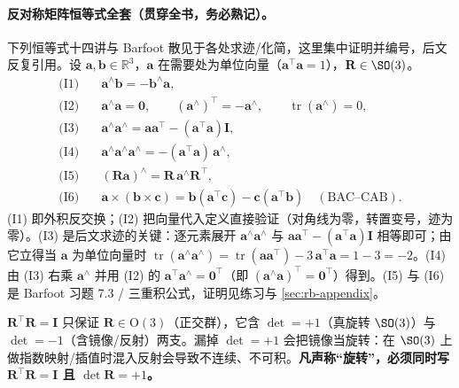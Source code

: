 \paragraph{反对称矩阵恒等式全套（贯穿全书，务必熟记）。}下列恒等式十四讲与 Barfoot 散见于各处求迹/化简，这里集中证明并编号，后文反复引用。设 $\mathbf{a},\mathbf{b}\in\mathbb{R}^3$，$\mathbf{a}$ 在需要处为单位向量（$\mathbf{a}^\top\mathbf{a}=1$），$\mathbf{R}\in\SO(3)$。
\begin{align}
  \text{(I1)}\quad& \mathbf{a}^\wedge\mathbf{b}=-\mathbf{b}^\wedge\mathbf{a}, \label{eq:rb-id1}\\
  \text{(I2)}\quad& \mathbf{a}^\wedge\mathbf{a}=\mathbf{0},\qquad (\mathbf{a}^\wedge)^\top=-\mathbf{a}^\wedge,\qquad \operatorname{tr}(\mathbf{a}^\wedge)=0, \label{eq:rb-id2}\\
  \text{(I3)}\quad& \mathbf{a}^\wedge\mathbf{a}^\wedge=\mathbf{a}\mathbf{a}^\top-(\mathbf{a}^\top\mathbf{a})\mathbf{I}, \label{eq:rb-id3}\\
  \text{(I4)}\quad& \mathbf{a}^\wedge\mathbf{a}^\wedge\mathbf{a}^\wedge=-(\mathbf{a}^\top\mathbf{a})\,\mathbf{a}^\wedge, \label{eq:rb-id4}\\
  \text{(I5)}\quad& (\mathbf{R}\mathbf{a})^\wedge=\mathbf{R}\,\mathbf{a}^\wedge\mathbf{R}^\top, \label{eq:rb-id5}\\
  \text{(I6)}\quad& \mathbf{a}\times(\mathbf{b}\times\mathbf{c})=\mathbf{b}(\mathbf{a}^\top\mathbf{c})-\mathbf{c}(\mathbf{a}^\top\mathbf{b})\quad(\text{BAC--CAB}). \label{eq:rb-id6}
\end{align}
(I1) 即外积反交换；(I2) 把向量代入定义直接验证（对角线为零，转置变号，迹为零）。(I3) 是后文求迹的关键：逐元素展开 $\mathbf{a}^\wedge\mathbf{a}^\wedge$ 与 $\mathbf{a}\mathbf{a}^\top-(\mathbf{a}^\top\mathbf{a})\mathbf{I}$ 相等即可；由它立得当 $\mathbf{a}$ 为单位向量时 $\operatorname{tr}(\mathbf{a}^\wedge\mathbf{a}^\wedge)=\operatorname{tr}(\mathbf{a}\mathbf{a}^\top)-3\,\mathbf{a}^\top\mathbf{a}=1-3=-2$。(I4) 由 (I3) 右乘 $\mathbf{a}^\wedge$ 并用 (I2) 的 $\mathbf{a}^\top\mathbf{a}^\wedge=\mathbf{0}^\top$（即 $(\mathbf{a}^\wedge\mathbf{a})^\top=\mathbf{0}^\top$）得到。(I5) 与 (I6) 是 Barfoot 习题 7.3 / 三重积公式，证明见练习与 \cref{sec:rb-appendix}。

\begin{pitfall}[证明陷阱：把“正交”当成“旋转”，漏掉 $\det=+1$]
$\mathbf{R}^\top\mathbf{R}=\mathbf{I}$ 只保证 $\mathbf{R}\in\mathrm{O}(3)$（正交群），它含 $\det=+1$（真旋转 $\SO(3)$）与 $\det=-1$（含镜像/反射）两支。漏掉 $\det=+1$ 会把镜像当旋转：在 $\SO(3)$ 上做指数映射/插值时混入反射会导致不连续、不可积。\textbf{凡声称“旋转”，必须同时写 $\mathbf{R}^\top\mathbf{R}=\mathbf{I}$ 且 $\det\mathbf{R}=+1$。}
\end{pitfall}

